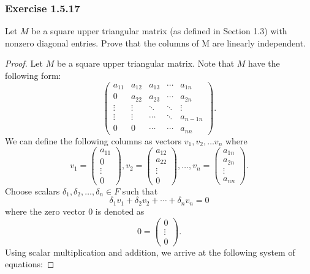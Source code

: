 \subsubsection{Exercise 1.5.17} Let \( M  \) be a square upper triangular matrix (as defined in Section 1.3) with nonzero diagonal entries. Prove that the columns of M are linearly independent.
\begin{proof}
Let \( M  \) be a square upper triangular matrix. Note that \( M  \) have the following form:
\[  
    \begin{pmatrix}
        a_{11} & a_{12} & a_{13} &  \cdots &  a_{1n} \\
        0 & a_{22} &  a_{23} &  \cdots &  a_{2n} \\
        \vdots & \vdots & \ddots & \ddots & \vdots \\ 
        \vdots & \vdots & \cdots & \ddots & a_{n-1 n } \\
        0 & 0  & \cdots & \cdots & a_{n n }
    \end{pmatrix}.
 \]
We can define the following columns as vectors \( v_{1}, v_{2}, \dots v_{n}   \) where 
\[  
    v_{1}  =
    \begin{pmatrix}
        a_{11} \\
        0 \\
        \vdots \\
        0
    \end{pmatrix}, v_{2} = \begin{pmatrix}
        a_{12} \\
        a_{22} \\
        \vdots \\
        0 
    \end{pmatrix}, \dots , v_{n} = \begin{pmatrix}
        a_{1n} \\
        a_{2n} \\
        \vdots \\
        a_{n n }
    \end{pmatrix}.
\]
Choose scalars \( \delta_{1} , \delta_{2}, \dots, \delta_{n} \in F  \) such that 
\[  \delta_{1} v_{1} + \delta_{2} v_{2} + \cdots + \delta_{n} v_{n} = 0 \]
where the zero vector \( 0  \) is denoted as 
\[  0 = \begin{pmatrix}
    0 \\ 
    \vdots \\
    0
\end{pmatrix}. \]
Using scalar multiplication and addition, we arrive at the following system of equations:

\end{proof}
